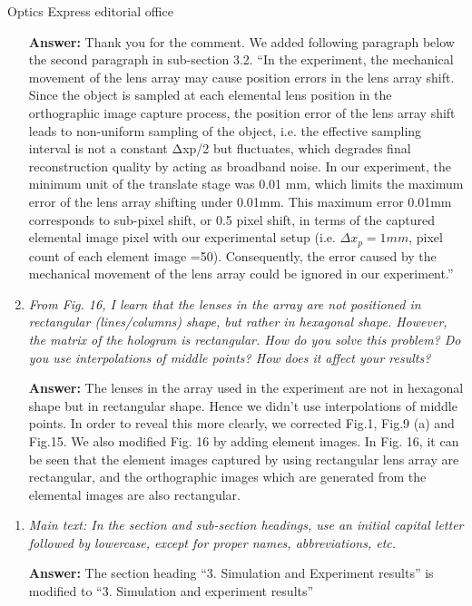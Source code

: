 \documentclass[a4paper,11pt]{letter}
\begin{document}
\begin{letter}{Optics Express editorial office}
\begin{enumerate}
\bigskip
\textbf{Answer:}
Thank you for the comment. We added following paragraph below the second paragraph in sub-section 3.2.
“In the experiment, the mechanical movement of the lens array may cause position errors in the lens array shift. Since the object is sampled at each elemental lens position in the orthographic image capture process, the position error of the lens array shift leads to non-uniform sampling of the object, i.e. the effective sampling interval is not a constant Δxp/2 but fluctuates, which degrades final reconstruction quality by acting as broadband noise. 
In our experiment, the minimum unit of the translate stage was 0.01 mm, which limits the maximum error of the lens array shifting under 0.01mm. This maximum error 0.01mm corresponds to sub-pixel shift, or 0.5 pixel shift, in terms of the captured elemental image pixel with our experimental setup (i.e. $\Delta x_p=1mm$, pixel count of each element image =50). Consequently, the error caused by the mechanical movement of the lens array could be ignored in our experiment.”


\item \textit{From Fig. 16, I learn that the lenses in the array are not positioned in rectangular (lines/columns) shape, but rather in hexagonal shape. However, the matrix of the hologram is rectangular. How do you solve this problem? Do you use interpolations of middle points? How does it affect your results?}

\bigskip
\textbf{Answer:} 
The lenses in the array used in the experiment are not in hexagonal shape but in rectangular shape. Hence we didn’t use interpolations of middle points. In order to reveal this more clearly, we corrected Fig.1, Fig.9 (a) and Fig.15. We also modified Fig. 16 by adding element images. In Fig. 16, it can be seen that the element images captured by using rectangular lens array are rectangular, and the orthographic images which are generated from the elemental images are also rectangular.

\end{enumerate}


{}

\begin{enumerate}

\item \textit{Main text: In the section and sub-section headings, use an initial capital letter followed by lowercase, except for proper names, abbreviations, etc.}

\bigskip
\textbf{Answer:}
The section heading “3. Simulation and Experiment results” is modified to “3. Simulation and experiment results”



\end{enumerate}
\end{letter}
\end{document}
